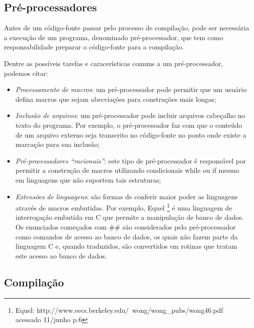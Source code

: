 \subsection{Pré-processadores}


Antes de um código-fonte passar pelo processo de compilação, pode ser
 necessária a execução de um programa, denominado pré-processador, que
 tem como responsabilidade preparar o código-fonte para a compilação. 

Dentre as possíveis tarefas e caracerísticas comuns a um pré-processador,
 podemos citar:

\begin{itemize}

\item \textit{Processamento de macros}: um pré-processador pode permitir que um usuário 
    defina macros que sejam abreviações para construções mais longas\cite{ref11};

\item \textit{Inclusão de arquivos}: um pré-processador pode incluir arquivos cabeçalho no
     texto do programa. Por exemplo, o pré-processador faz com que o conteúdo de
     um arquivo externo seja transcrito no código-fonte no ponto onde existe a 
    marcação para sua inclusão\cite{ref11};

\item \textit{Pré-processadores “racionais”}: este tipo de pré-processador é responsável 
    por permitir a construção de macros utilizando condicionais while ou if mesmo
     em linguagens que não suportem tais estruturas\cite{ref11};

\item \textit{Extensões de linguagens}: são formas de conferir maior poder as linguagens
     através de macros embutidas. Por exemplo, 
    Equel \footnote{Equel:  http://www.eecs.berkeley.edu/~wong/wong\_pubs/wong46.pdf
     acessado 11/junho p.6} é uma linguagem de 
    interrogação embutida em C que permite a manipulação de banco de dados. 
    Os enunciados começados com \#\# são considerados pelo pré-processador como
     comandos de acesso ao banco de dados, os quais não fazem parte da 
    linguagem C e, quando traduzidos, são convertidos em rotinas que tratam 
    este acesso ao banco de dados\cite{ref11}.

\end{itemize}

\subsection{Compilação}

